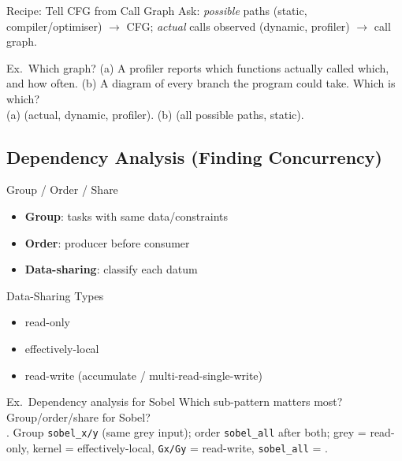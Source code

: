 \begin{KR}{Recipe: Tell CFG from Call Graph}
    Ask: \emph{possible} paths (static, compiler/optimiser) $\to$ CFG; \emph{actual} calls observed (dynamic, profiler) $\to$ call graph.
\end{KR}

\begin{example2}{Ex.\ Which graph?}
    (a) A profiler reports which functions actually called which, and how often. (b) A diagram of every branch the program could take. Which is which?
     \\ 
    (a)  (actual, dynamic, profiler). (b)  (all possible paths, static).
\end{example2}

\subsection{Dependency Analysis (Finding Concurrency)}


\begin{concept}{Group / Order / Share}
    \begin{itemize}
        \item \textbf{Group}: tasks with same data/constraints
        \item \textbf{Order}: producer before consumer
        \item \textbf{Data-sharing}: classify each datum
    \end{itemize}
\end{concept}

\begin{definition}{Data-Sharing Types}
    \begin{itemize}
        \item read-only
        \item effectively-local
        \item read-write (accumulate / multi-read-single-write)
    \end{itemize}
\end{definition}

\multend

\begin{example2}{Ex.\ Dependency analysis for Sobel}
    Which sub-pattern matters most? Group/order/share for Sobel?
     \\ 
    . Group \texttt{sobel\_x/y} (same grey input); order \texttt{sobel\_all} after both; grey = read-only, kernel = effectively-local, \texttt{Gx/Gy} = read-write, \texttt{sobel\_all} = .
\end{example2}

